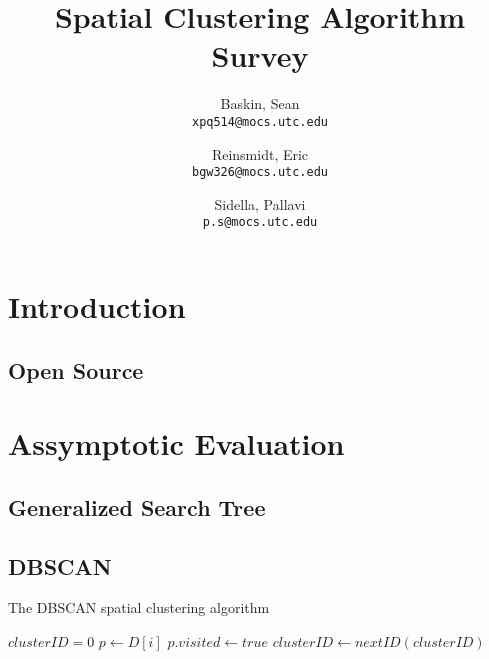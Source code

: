 \documentclass{article}
\author{
  Baskin, Sean\\
  \texttt{xpq514@mocs.utc.edu}
  \and
  Reinsmidt, Eric\\
  \texttt{bgw326@mocs.utc.edu}
  \and
  Sidella, Pallavi\\
  \texttt{p.s@mocs.utc.edu}
}
\title{Spatial Clustering Algorithm Survey}
\begin{document}
\maketitle

\section{Introduction}

\subsection{Open Source}

\section{Assymptotic Evaluation}

\subsection{Generalized Search Tree}

\subsection{DBSCAN}

\begin{algorithm}
\caption{The DBSCAN spatial clustering algorithm}
\begin{algorithmic}[1]
	\State $clusterID = 0$
      \State $p \gets D[i]$
      \State $p.visited \gets true$    
          \State $clusterID \gets nextID(clusterID)$
        \EndIf
      \EndIf
	\EndFor
\EndProcedure
\Statex
{}
\EndProcedure
\end{algorithmic}
\end{algorithm}
\end{document}
